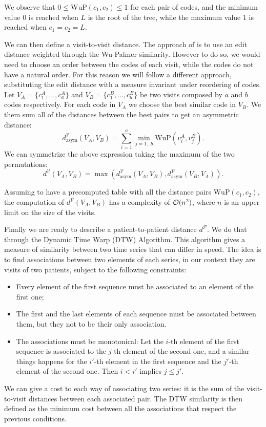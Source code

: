 \documentclass[]{marticle}
\newcommand{\patients}{\mathcal{P}}
\newcommand{\visits}{\mathcal{V}}
\begin{document}
We observe that $0 \leq \text{WuP}(c_1, c_2) \leq 1$ for each pair of codes, and the minimum value
$0$ is reached when $L$ is the root of the tree, while the maximum value $1$ is reached when $c_1 =
c_2 = L$.

We can then define a visit-to-visit distance. The approach of \cite{panigutti-xai} is to use an edit
distance weighted through the Wu-Palmer similarity. However to do so, we would need to choose an
order between the codes of each visit, while the codes do not have a natural order. For this reason
we will follow a different approach, substituting the edit distance with a measure invariant under
reordering of codes.
Let $V_A = \{c^A_1, \dots, c^A_a\}$ and $V_B = \{c^B_1,\dots, c^B_b\}$ be two visits composed by $a$ and
$b$ codes respectively. For each code in $V_A$ we choose the best similar code in $V_B$. We them sum
all of the distances between the best pairs to get an asymmetric distance: $$ d^\visits _\text{asym}
(V_A, V_B) = \sum_{i=1}^a \min_{j=1\dots b} \text{WuP}(v^A_i, v^B_j). $$ We can symmetrize the above
expression taking the maximum of the two permutations:
$$ d^\visits  (V_A, V_B) = \max(d^\visits _\text{asym} (V_A, V_B), d^\visits _\text{asym} (V_B, V_A)). $$

Assuming to have a precomputed table with all the distance pairs $\text{WuP}(c_1, c_2)$, the
computation of $d^\visits (V_A, V_B)$ has a complexity of $\mathcal{O}(n^2)$, where $n$ is an upper
limit on the size of the visits.

Finally we are ready to describe a patient-to-patient distance $d^\patients$. We do that through
the Dynamic Time Warp (DTW) Algorithm. This algorithm gives a measure of similarity between two time
series that can differ in speed. The idea is to find associations between two elements of each
series, in our context they are visits of two patients, subject to the following constraints:
\begin{itemize}
\item Every element of the first sequence must be associated to an element of the first one;
\item The first and the last elements of each sequence must be associated between them, but they not to
    be their only association.
\item The associations must be monotonical: Let the $i$-th element of the first sequence is
    associated to the $j$-th element of the second one, and a similar things happens for the $i'$-th
    element in the first sequence and the $j'$-th element of the second one. Then $i<i'$ implies
    $j\leq j'$.
\end{itemize}
We can give a cost to each way of associating two series: it is the sum of the visit-to-visit
distances between each associated pair. The DTW similarity is then defined as the minimum cost
between all the associations that respect the previous conditions.
\end{document}
